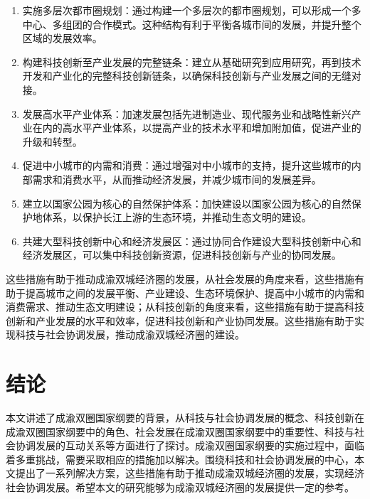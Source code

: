 \documentclass{CjC}
\begin{document}
\begin{enumerate}
    \item 实施多层次都市圈规划：通过构建一个多层次的都市圈规划，可以形成一个多中心、多组团的合作模式。\cite{董晓峰2005都市圈理论发展研究}这种结构有利于平衡各城市间的发展，并提升整个区域的发展效率。
    \item 构建科技创新至产业发展的完整链条：建立从基础研究到应用研究，再到技术开发和产业化的完整科技创新链条，以确保科技创新与产业发展之间的无缝对接\cite{徐瑾2010地区信息化对经济增长的影响分析}。
    \item 发展高水平产业体系：加速发展包括先进制造业、现代服务业和战略性新兴产业在内的高水平产业体系，以提高产业的技术水平和增加附加值，促进产业的升级和转型。
    \item 促进中小城市的内需和消费：通过增强对中小城市的支持，提升这些城市的内部需求和消费水平，从而推动经济发展，并减少城市间的发展差异。
    \item 建立以国家公园为核心的自然保护体系：加快建设以国家公园为核心的自然保护地体系，以保护长江上游的生态环境，并推动生态文明的建设\cite{周睿2016中国国家公园体系构建方法研究}。
    \item 共建大型科技创新中心和经济发展区：通过协同合作建设大型科技创新中心和经济发展区，可以集中科技创新资源，促进科技创新与产业的协同发展\cite{秦鹏2021成渝地区双城经济圈协同发展的理论逻辑与路径探索}。
\end{enumerate}

这些措施有助于推动成渝双城经济圈的发展，从社会发展的角度来看，这些措施有助于提高城市之间的发展平衡、产业建设、生态环境保护、提高中小城市的内需和消费需求、推动生态文明建设；从科技创新的角度来看，这些措施有助于提高科技创新和产业发展的水平和效率，促进科技创新和产业协同发展。这些措施有助于实现科技与社会协调发展，推动成渝双城经济圈的建设。

\section{结论}

本文讲述了成渝双圈国家纲要的背景，从科技与社会协调发展的概念、科技创新在成渝双圈国家纲要中的角色、社会发展在成渝双圈国家纲要中的重要性、科技与社会协调发展的互动关系等方面进行了探讨。成渝双圈国家纲要的实施过程中，面临着多重挑战，需要采取相应的措施加以解决。围绕科技和社会协调发展的中心，本文提出了一系列解决方案，这些措施有助于推动成渝双城经济圈的发展，实现经济社会协调发展。希望本文的研究能够为成渝双城经济圈的发展提供一定的参考。

\vspace{10pt}
\end{document}
